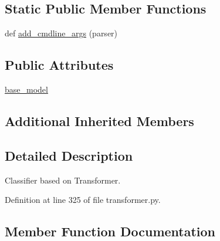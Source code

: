 \subsection*{Static Public Member Functions}
\begin{DoxyCompactItemize}
\item 
def \hyperlink{classparlai_1_1agents_1_1transformer_1_1transformer_1_1TransformerClassifierAgent_aeef1fe7e4165b65c79816d2e0e9ce5db}{add\+\_\+cmdline\+\_\+args} (parser)
\end{DoxyCompactItemize}
\subsection*{Public Attributes}
\begin{DoxyCompactItemize}
\item 
\hyperlink{classparlai_1_1agents_1_1transformer_1_1transformer_1_1TransformerClassifierAgent_a3cb00be366fe479790010ea30737c0b4}{base\+\_\+model}
\end{DoxyCompactItemize}
\subsection*{Additional Inherited Members}


\subsection{Detailed Description}
\begin{DoxyVerb}Classifier based on Transformer.
\end{DoxyVerb}
 

Definition at line 325 of file transformer.\+py.



\subsection{Member Function Documentation}
\mbox{\label{classparlai_1_1agents_1_1transformer_1_1transformer_1_1TransformerClassifierAgent_aeef1fe7e4165b65c79816d2e0e9ce5db}} 
